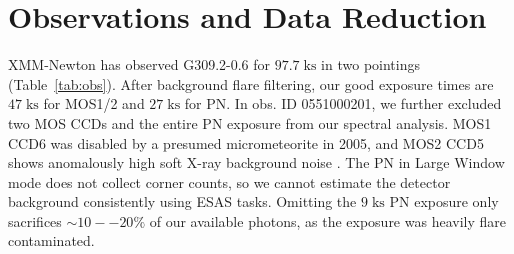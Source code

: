 \documentclass[preprint2,tighten,trackchanges]{aastex6}
\newcommand*{\mt}{\mathrm}
\newcommand*{\unit}[1]{\;\mt{#1}}  %
\newcommand*{\abt}{\mathord{\sim}} %
\begin{document}
\section{Observations and Data Reduction} \label{sec:obs}

XMM-Newton has observed G309.2-0.6 for $97.7 \unit{ks}$ in two pointings
(Table~\ref{tab:obs}).
After background flare filtering, our good exposure times are $47 \unit{ks}$
for MOS1/2 and $27 \unit{ks}$ for PN.
In obs. ID 0551000201, we further excluded two MOS CCDs and the entire PN
exposure from our spectral analysis.
MOS1 CCD6 was disabled by a presumed micrometeorite in 2005, and MOS2 CCD5
shows anomalously high soft X-ray background noise \citep[cf.][]{kuntz2008}.
The PN in Large Window mode does not collect corner counts, so we cannot
estimate the detector background consistently using ESAS tasks.
Omitting the $9 \unit{ks}$ PN exposure only sacrifices $\abt 10--20\%$ of our
available photons, as the exposure was heavily flare contaminated.




\end{document}
